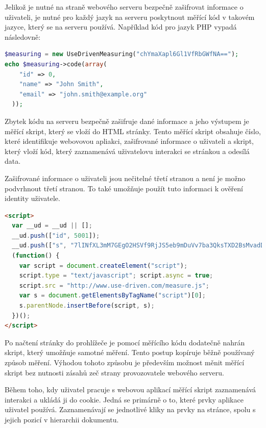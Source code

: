 \documentclass[bc,male,java,dept456]{diploma}						%
\begin{document}
Jelikož je nutné na straně webového serveru bezpečně zašifrovat informace o uživateli, je nutné pro každý jazyk na serveru poskytnout měřící kód v takovém jazyce, který se na serveru používá. Například kód pro jazyk PHP vypadá následovně:

\begin{lstlisting}[label=src:neco,language=PHP, caption=Měřící kód na straně serveru (PHP)]
$measuring = new UseDrivenMeasuring("chYmaXapl6Gl1VfRbGWfNA==");
echo $measuring->code(array(
    "id" => 0,
    "name" => "John Smith",
    "email" => "john.smith@example.org"
  ));
\end{lstlisting}

Zbytek kódu na serveru bezpečně zašifruje dané informace a jeho výstupem je měřící skript, který se vloží do HTML stránky. Tento měřící skript obsahuje číslo, které identifikuje webovovou apliakci, zašifrované informace o uživateli a skript, který vloží kód, který zaznamenává uživatelovu interakci se stránkou a odesílá data.

Zašifrované informace o uživateli jsou nečitelné třetí stranou a není je možno podvrhnout třetí stranou. To také umožňuje použít tuto informaci k ověření identity uživatele.

\begin{lstlisting}[label=src:html,caption=Měřící skript,language=HTML]
<script> 
  var __ud = __ud || [];  
  __ud.push(["id", 5001]);
  __ud.push(["s", "7lINfXL3mM7GEgO2HSVf9RjJS5eb9mDuVv7ba3QksTXD2BsMvadDPeU-CoIzid5PDqJI6gCOi0EjmEGtI6XSDbu9at9vY8fw6rwssCDJVA2dfuZYF7kDwzpjzivNO OfAXQls78FzwcjDhc-gxwHohMAa0l9mb7MMlV5JcDDnx7A"]);
  (function() {
    var script = document.createElement("script");
    script.type = "text/javascript"; script.async = true;
    script.src = "http://www.use-driven.com/measure.js";
    var s = document.getElementsByTagName("script")[0]; 
    s.parentNode.insertBefore(script, s);
  })();
</script> 
\end{lstlisting}


Po načtení stránky do prohlížeče je pomocí měřícího kódu dodatečně nahrán skript, který umožňuje samotné měření. Tento postup kopíruje běžně používaný způsob měření. Výhodou tohoto způsobu je především možnost měnit měřící skript bez nutnosti zásahů zeč strany provozovatele webového serveru.

Během toho, kdy uživatel pracuje s webovou aplikací měřící skript zaznamenává interakci a ukládá ji do cookie. Jedná se primárně o to, které prvky aplikace uživatel používá. Zaznamenávají se jednotlivé kliky na prvky na stránce, spolu s jejich pozicí v hierarchii dokumentu.
\end{document}
